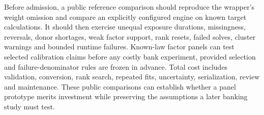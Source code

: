 Before admission, a public reference comparison should reproduce the
wrapper's weight omission and compare an explicitly configured engine on
known target calculations. It should then exercise unequal exposure
durations, missingness, reversals, donor shortages, weak factor support,
rank resets, failed solves, cluster warnings and bounded runtime failures.
Known-law factor panels can test selected calibration claims before any
costly bank experiment, provided selection and failure-denominator rules
are frozen in advance. Total cost includes validation, conversion, rank
search, repeated fits, uncertainty, serialization, review and maintenance.
These public comparisons can establish whether a panel prototype merits
investment while preserving the assumptions a later banking study must test.
\cite{exec21_gsynth_reference}
